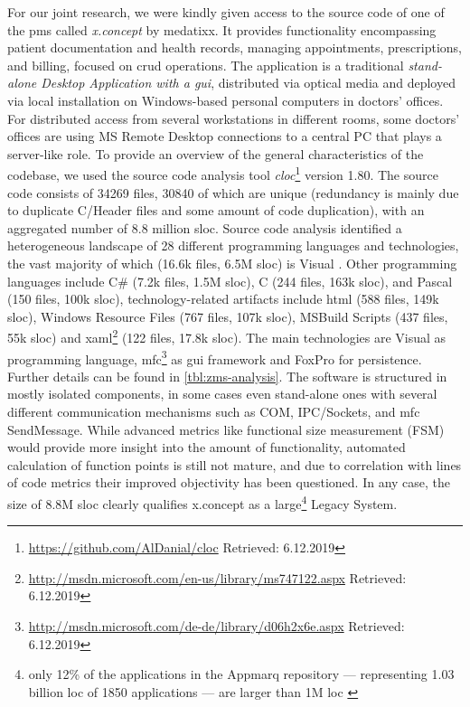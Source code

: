 For our joint research, we were kindly given access to the source code of one of the \gls{pms} called \emph{x.concept} by medatixx.
It provides functionality encompassing patient documentation and health records, managing appointments, prescriptions, and billing, focused on \gls{crud} operations.
The application is a traditional \emph{stand-alone \gls{Desktop Application} with a \gls{gui}}, distributed via optical media and deployed via local installation on Windows-based personal computers in doctors' offices.
For distributed access from several workstations in different rooms, some doctors' offices are using MS Remote Desktop connections to a central PC that plays a server-like role.
To provide an overview of the general characteristics of the codebase, we used the source code analysis tool \emph{cloc}\footnote{\url{https://github.com/AlDanial/cloc} Retrieved: 6.12.2019} version 1.80.
The source code consists of 34269 files, 30840 of which are unique (redundancy is mainly due to duplicate C/\cpp Header files and some amount of code duplication), with an aggregated number of 8.8 million \gls{sloc}.
Source code analysis identified a heterogeneous landscape of 28 different programming languages and technologies, the vast majority of which (16.6k files, 6.5M \gls{sloc}) is Visual \cpp.
Other programming languages include C\# (7.2k files, 1.5M \gls{sloc}), C (244 files, 163k \gls{sloc}), and Pascal (150 files, 100k \gls{sloc}), technology-related \glspl{artifact} include \gls{html} (588 files, 149k \gls{sloc}), Windows Resource Files (767 files, 107k \gls{sloc}), MSBuild Scripts (437 files, 55k \gls{sloc}) and \gls{xaml}\footnote{\url{http://msdn.microsoft.com/en-us/library/ms747122.aspx} Retrieved: 6.12.2019} (122 files, 17.8k \gls{sloc}).
The main technologies are Visual \cpp as programming language, \gls{mfc}\footnote{\url{http://msdn.microsoft.com/de-de/library/d06h2x6e.aspx} Retrieved: 6.12.2019} as \gls{gui} framework and FoxPro for persistence.
Further details can be found in \cref{tbl:zms-analysis}.
The software is structured in mostly isolated components, in some cases even stand-alone ones with several different communication mechanisms such as COM, IPC/Sockets, and \gls{mfc} SendMessage.
While advanced metrics like functional size measurement (FSM) \autocite{ISO/IEC2009FSM} would provide more insight into the amount of functionality, automated calculation of function points is still not mature, and due to correlation with lines of code metrics \autocite{Albrecht1983FP} their improved objectivity has been questioned.
In any case, the size of 8.8M \gls{sloc} clearly qualifies x.concept as a large\footnote{only 12\% of the applications in the Appmarq repository --- representing 1.03 billion \gls{loc} of 1850 applications --- are larger than 1M \gls{loc} \autocite{CAST2017}} \gls{Legacy System}.

